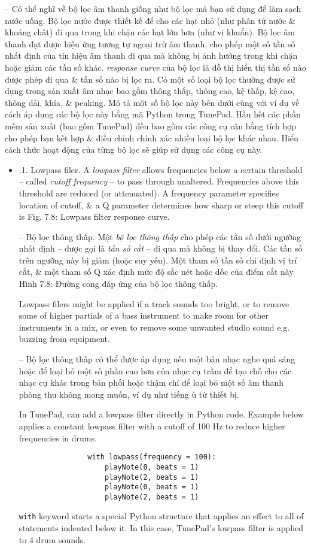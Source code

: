 \documentclass{article}
\begin{document}
\begin{itemize}
\begin{itemize}
		-- Có thể nghĩ về bộ lọc âm thanh giống như bộ lọc mà bạn sử dụng để làm sạch nước uống. Bộ lọc nước được thiết kế để cho các hạt nhỏ (như phân tử nước \& khoáng chất) đi qua trong khi chặn các hạt lớn hơn (như vi khuẩn). Bộ lọc âm thanh đạt được hiệu ứng tương tự ngoại trừ âm thanh, cho phép một số tần số nhất định của tín hiệu âm thanh đi qua mà không bị ảnh hưởng trong khi chặn hoặc giảm các tần số khác. {\it response curve} của bộ lọc là đồ thị hiển thị tần số nào được phép đi qua \& tần số nào bị lọc ra. Có một số loại bộ lọc thường được sử dụng trong sản xuất âm nhạc bao gồm thông thấp, thông cao, kệ thấp, kệ cao, thông dải, khía, \& peaking. Mô tả một số bộ lọc này bên dưới cùng với ví dụ về cách áp dụng các bộ lọc này bằng mã Python trong TunePad. Hầu hết các phần mềm sản xuất (bao gồm TunePad) đều bao gồm các công cụ cân bằng tích hợp cho phép bạn kết hợp \& điều chỉnh chính xác nhiều loại bộ lọc khác nhau. Hiểu cách thức hoạt động của từng bộ lọc sẽ giúp sử dụng các công cụ này.
		\begin{itemize}
			\item {.1. Lowpass filer.} A {\it lowpass filter} allows frequencies below a certain threshold -- called {\it cutoff frequency} -- to pass through unaltered. Frequencies above this threshold are reduced (or attenuated). A frequency parameter specifies location of cutoff, \& a Q parameter determines how sharp or steep this cutoff is {\sf Fig. 7.8: Lowpass filter response curve}.
			
			-- {\sf Bộ lọc thông thấp.} Một {\it bộ lọc thông thấp} cho phép các tần số dưới ngưỡng nhất định -- được gọi là {\it tần số cắt} -- đi qua mà không bị thay đổi. Các tần số trên ngưỡng này bị giảm (hoặc suy yếu). Một tham số tần số chỉ định vị trí cắt, \& một tham số Q xác định mức độ sắc nét hoặc dốc của điểm cắt này {\sf Hình 7.8: Đường cong đáp ứng của bộ lọc thông thấp}.
			
			Lowpass filers might be applied if a track sounds too bright, or to remove some of higher partials of a bass instrument to make room for other instruments in a mix, or even to remove some unwanted studio sound e.g. buzzing from equipment.
			
			-- Bộ lọc thông thấp có thể được áp dụng nếu một bản nhạc nghe quá sáng hoặc để loại bỏ một số phần cao hơn của nhạc cụ trầm để tạo chỗ cho các nhạc cụ khác trong bản phối hoặc thậm chí để loại bỏ một số âm thanh phòng thu không mong muốn, ví dụ như tiếng ù từ thiết bị.
			
			In TunePad, can add a lowpass filter directly in Python code. Example below applies a constant lowpass filter with a cutoff of 100 Hz to reduce higher frequencies in drums.
			\begin{verbatim}
				with lowpass(frequency = 100):
				    playNote(0, beats = 1)
				    playNote(2, beats = 1)
				    playNote(0, beats = 1)
				    playNote(2, beats = 1)
			\end{verbatim}
			{\tt with} keyword starts a special Python structure that applies an effect to all of statements indented below it. In this case, TunePad's lowpass filter is applied to 4 drum sounds.
			

\end{itemize}
\end{itemize}
\end{itemize}
\end{document}
